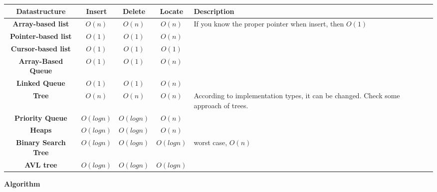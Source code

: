 \medskip
\begin{center}
    \begin{tabular}{|c|c|c|c|p{5.5cm}|}
    \hline
    \textbf{Datastructure} & \textbf{Insert} & \textbf{Delete} & \textbf{Locate} & \textbf{Description} \\
    \hline\hline
    \textbf{Array-based list} & $O(n)$ & $O(n)$ & $O(n)$ & If you know the proper pointer when insert, then $O(1)$\\ \hline
    \textbf{Pointer-based list} & $O(1)$ & $O(1)$ & $O(n)$ & \\ \hline
    \textbf{Cursor-based list} & $O(1)$ & $O(1)$ & $O(1)$ &  \\ \hline
    \textbf{Array-Based Queue} & $O(1)$ & $O(1)$ & $O(n)$ &  \\ \hline
    \textbf{Linked Queue} & $O(1)$ & $O(1)$ & $O(n)$ & \\ \hline
    \textbf{Tree} & $O(n)$ & $O(n)$ & $O(n)$ & According to implementation types, it can be changed. Check some approach of trees. \\ \hline
    \textbf{Priority Queue} & $O(log n)$ & $O(log n)$ & $O(n)$ &  \\ \hline
    \textbf{Heaps} & $O(log n)$ & $O(log n)$ & $O(n)$ & \\ \hline
    \textbf{Binary Search Tree} & $O(log n)$ & $O(log n)$ & $O(log n)$ & worst case, $O(n)$ \\ \hline
    \textbf{AVL tree} & $O(log n)$ & $O(log n)$ & $O(log n)$ &  \\ \hline
    \end{tabular}
\end{center}
\medskip

{\textbf{Algorithm}}

